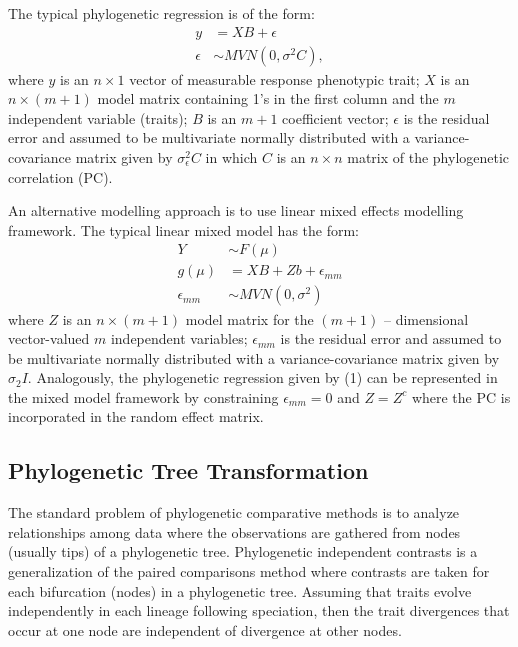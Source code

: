 The typical phylogenetic regression is of the form:
\begin{align}
y & = XB + \epsilon \\
\epsilon & \sim MVN(0,\sigma^{2}C),
\label{eq:gls}
\end{align}
where $y$ is an $n \times 1$ vector of measurable response phenotypic trait; $X$ is an $n \times (m + 1)$ model matrix containing 1's in the first column and the $m$ independent variable (traits); $B$ is an $m + 1$ coefficient vector; $\epsilon$ is the residual error and assumed to be multivariate normally distributed with a variance-covariance matrix given by $\sigma^{2}_{\epsilon}C$ in which $C$ is an $n \times n$ matrix of the phylogenetic correlation (PC).

An alternative modelling approach is to use linear mixed effects modelling framework.
The typical linear mixed model has the form:
\begin{align}
Y & \sim F(\mu) \\
g(\mu) & = XB + Zb + \epsilon_{mm} \\
\epsilon_{mm} & \sim MVN(0,\sigma^2)
\end{align}
where $Z$ is an $n \times (m+1)$ model matrix for the $(m+1)$ -- dimensional vector-valued $m$ independent variables; $\epsilon_{mm}$ is the residual error and assumed to be multivariate normally distributed with a variance-covariance matrix given by $\sigma_{2}I$.
Analogously, the phylogenetic regression given by (1) can be represented in the mixed model framework by constraining $\epsilon_{mm} = 0$ and $Z=Z^{c}$ where the PC is incorporated in the random effect matrix. 

\subsection{Phylogenetic Tree Transformation}
The standard problem of phylogenetic comparative methods is to analyze relationships among data where the observations are gathered from nodes (usually tips) of a phylogenetic tree.
Phylogenetic independent contrasts is a generalization of the paired comparisons method where contrasts are taken for each bifurcation (nodes) in a phylogenetic tree. 
Assuming that traits evolve independently in each lineage following speciation, then the trait divergences that occur at one node are independent of divergence at other nodes.  

